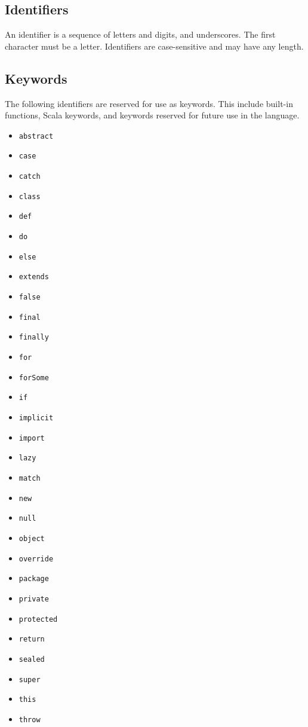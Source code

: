 \subsection{Identifiers}
An identifier is a sequence of letters and digits, and underscores. The first character must be a letter. Identifiers are case-sensitive and may have any length.

\subsection{Keywords}
The following identifiers are reserved for use as keywords. This include
built-in functions, Scala keywords, and keywords reserved for future use in the
language.
\begin{itemize}
	\item{\verb=abstract=}
	\item{\verb=case=}
	\item{\verb=catch=}
	\item{\verb=class=}
	\item{\verb=def=}
	\item{\verb=do=}
	\item{\verb=else=}
	\item{\verb=extends=}
	\item{\verb=false=}
	\item{\verb=final=}
	\item{\verb=finally=}
	\item{\verb=for=}
	\item{\verb=forSome=}
	\item{\verb=if=}
	\item{\verb=implicit=}
	\item{\verb=import=}
	\item{\verb=lazy=}
	\item{\verb=match=}
	\item{\verb=new=}
	\item{\verb=null=}
	\item{\verb=object=}
	\item{\verb=override=}
	\item{\verb=package=}
	\item{\verb=private=}
	\item{\verb=protected=}
	\item{\verb=return=}
	\item{\verb=sealed=}
	\item{\verb=super=}
	\item{\verb=this=}
	\item{\verb=throw=}

\end{itemize}
